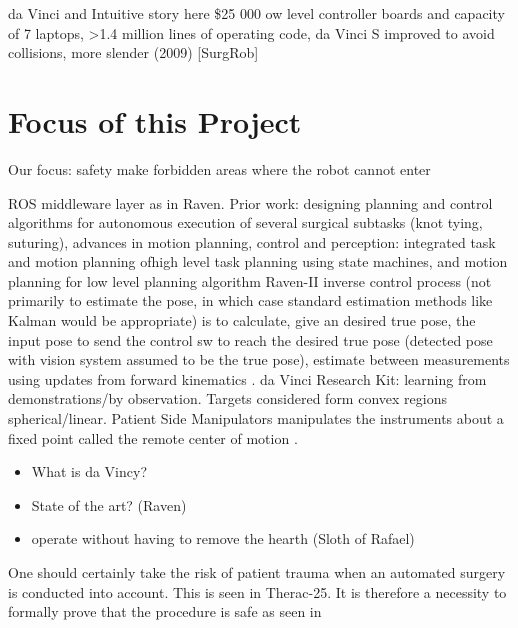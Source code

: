 da Vinci and Intuitive story here
\$25 000 ow level controller boards and capacity of 7 laptops, >1.4 million lines of operating code, da Vinci S improved to avoid collisions, more slender (2009) [SurgRob]

\section{Focus of this Project}
Our focus:
safety
make forbidden areas where the robot cannot enter

ROS middleware layer as in Raven.
Prior work: designing planning and control algorithms for autonomous execution of several surgical subtasks (knot tying, suturing), advances in motion planning, control and perception: integrated task and motion planning ofhigh level task planning using state machines, and motion planning for low level planning algorithm  \citep{bib:raven_debride}
Raven-II inverse control process (not primarily to estimate the pose, in which case standard estimation methods like Kalman would be appropriate) is to calculate, give an desired true pose, the input pose to send the control sw to reach the desired true pose (detected pose with vision system assumed to be the true pose), estimate between measurements using updates from forward kinematics \citep{bib:raven_debride}.
da Vinci Research Kit: learning from demonstrations/by observation. Targets considered form convex regions spherical/linear. Patient Side Manipulators manipulates the instruments about a fixed point called the remote center of motion \citep{bib:raven_observ}.


\begin{itemize}
\item What is da Vincy?
\item State of the art? (Raven)
\item operate without having to remove the hearth (Sloth of Rafael)
\end{itemize}
One should certainly take the risk of patient trauma when an automated surgery is conducted into account. This is seen in Therac-25. It is therefore a necessity to formally prove that the procedure is safe as seen in \citep{bib:safety}